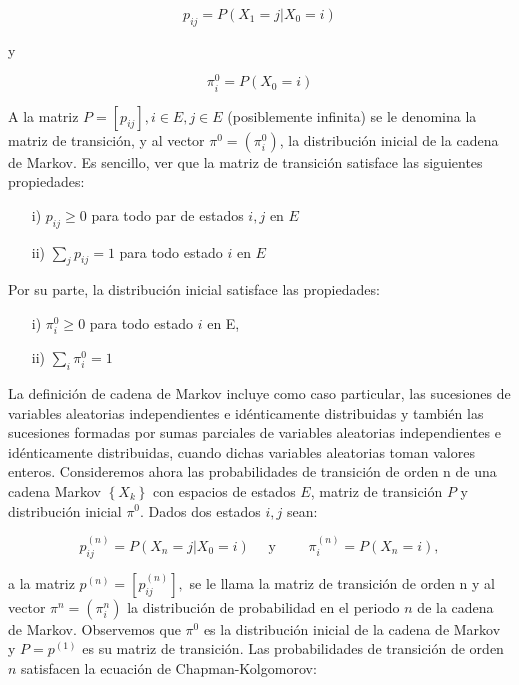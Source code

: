 		\begin{equation}
			p_{ij} = P( X_{ 1 }=j| X_{ 0 }=i) \label{2.7}
		\end{equation} 
		
		y
		 
		\begin{equation*}
			\pi_{i}^{0}=P( X_{0}=i) 
		\end{equation*}  
		
		A la matriz $ P = [p _{ij}], i\in E,j\in  E$ (posiblemente infinita) se le denomina la matriz de transici\'{o}n, y al vector $\pi^{0} =({ \pi  }_{ i }^{ 0 })$, la distribuci\'{o}n inicial de la cadena de Markov. Es sencillo, ver que la matriz de transici\'{o}n satisface las siguientes propiedades:
		
		\begin{enumerate}
			\item[i) ] $p_{ ij }\ge 0$ para todo par de estados $i,j$ en $E$
			\item[ii) ] $\sum _{ j }^{  }{ p_{ ij }=1 }$ para todo estado $i$ en $E$
		\end{enumerate}		
	
		\noindent
		Por su parte, la distribuci\'{o}n inicial satisface las propiedades:
		
		\begin{enumerate}
			\item[i) ] ${ \pi  }_{ i }^{0}\ge 0$ para todo estado $i$ en E,
			\item[ii) ]  $\sum_{ i }{ { \pi  }_{ i }^{0} }=1$
		\end{enumerate}
		
		La definici\'{o}n de cadena de Markov incluye como caso particular, las sucesiones de variables aleatorias independientes e id\'{e}nticamente distribuidas y tambi\'{e}n las sucesiones formadas por sumas parciales de variables aleatorias independientes e id\'{e}nticamente distribuidas, cuando dichas variables aleatorias toman valores enteros.
		Consideremos ahora las probabilidades de transici\'{o}n de orden n de una cadena Markov $\left\{  X_{ k } \right\} $ con espacios de estados $E$, matriz de transici\'{o}n $P$ y distribuci\'{o}n inicial $\pi^{0}$. Dados dos estados $i,j$ sean:
		
		\begin{equation}
		p_{ ij }^{ (n) }=P( X_{ n }=j| X_{ 0 }=i) \quad \mbox{ y } \quad \quad { \pi  }_{ i }^{( n) }=P( X_{ n }=i), \label{2.8}
		\end{equation}
		
		a la matriz $p^{( n) }=[p_{ ij }^{ (n) }],$ se le llama la matriz de transici\'{o}n de orden n y al vector ${ \pi  }^{ n }=({\pi}_{ i }^{ n })$ la distribuci\'{o}n de probabilidad en el periodo $n$ de la cadena de Markov. Observemos que ${ \pi  }^{ 0 }$ es la distribuci\'{o}n inicial de la cadena de Markov y $P=p^{( 1) }$ es su matriz de transici\'{o}n. 
		Las probabilidades de transici\'{o}n de orden $n$ satisfacen la ecuaci\'{o}n de Chapman-Kolgomorov:
		
